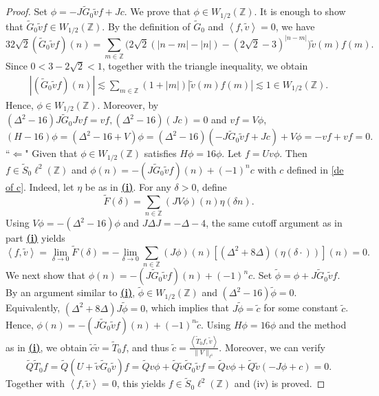 \documentclass[reqno, 11pt]{amsart}
\newcommand\Z{\mathbb{Z}}
\numberwithin{equation}{section}
\begin{document}
\begin{proof}
Set $\phi=-J\widetilde{G}_0\tilde{v}f+Jc.$ We prove that $\phi\in W_{1/2}(\Z)$. It is enough to show that $\widetilde{G}_0\tilde{v}f\in W_{1/2}(\Z)$. By the definition of $\widetilde{G}_0$ and $\left<f,\tilde{v}\right>=0$, we have
\begin{equation*}
32\sqrt2(\widetilde{G}_0\tilde{v}f)(n)
=\sum\limits_{m\in\Z}^{}\Big(2\sqrt2 (|n-m|-|n|)-\left(2\sqrt2-3\right)^{|n-m|}\Big)\tilde{v}(m)f(m).
\end{equation*}
Since $0<3-2\sqrt2<1$, together with the triangle inequality, we obtain
\begin{align*}
\left|(\widetilde{G}_0\tilde{v}f)(n)\right|\lesssim \sum\limits_{m\in\Z}(1+|m|)|\tilde{v}(m)f(m)|\lesssim1\in W_{1/2}(\Z).
\end{align*}
Hence, $\phi\in W_{1/2}(\Z)$. Moreover, by $(\Delta^2-16)J\widetilde{G}_0Jvf=vf,(\Delta^2-16)(Jc)=0$ and $vf=V\phi$,
$$(H-16)\phi=(\Delta^2-16+V)\phi=(\Delta^2-16)(-J\widetilde{G}_0\tilde{v}f+Jc)+V\phi=-vf+vf=0.$$
\vskip0.1cm
``$\bm{\Longleftarrow}$" Given that $\phi\in W_{1/2}(\Z)$ satisfies $H\phi=16\phi$. Let $f=Uv\phi$. Then $f\in \widetilde{S}_0\ell^2(\Z)$ and $\phi(n)=-(J\widetilde{G}_0\tilde{v}f)(n)+(-1)^nc$ with $c$ defined in \eqref{de of c}. Indeed, let $\eta$ be as in \textbf{\underline{(i)}}. For any $\delta>0$, define
$$\widetilde{F}(\delta)=\sum\limits_{n\in\Z}(JV\phi)(n)\eta(\delta n).$$
Using $V\phi=-(\Delta^2-16)\phi$ and $J\Delta J=-\Delta-4$, 
the same cutoff argument as in part \textbf{\underline{(i)}} yields
$$\left<f,\tilde{v}\right>=\lim\limits_{\delta\rightarrow0}\widetilde{F}(\delta)=-\lim\limits_{\delta\rightarrow0}\sum\limits_{n\in\Z} (J\phi)(n)[(\Delta^2+8\Delta)(\eta(\delta\cdot))](n)=0.$$
We next show that $\phi(n)=-(J\widetilde{G}_0\tilde{v}f)(n)+(-1)^nc$. Set $\tilde{\phi}=\phi+J\widetilde{G}_0\tilde{v}f$. By an argument similar to \textbf{\underline{(i)}}, $\tilde{\phi}\in W_{
1/2}(\Z)$ and $(\Delta^2-16)\tilde{\phi}=0$. Equivalently, $(\Delta^2+8\Delta)J\tilde{\phi}=0$, which implies that $J\tilde{\phi}=\tilde{c}$ for some constant $\tilde{c}$. Hence, $\phi(n)=-(J\widetilde G_0\tilde vf)(n)+(-1)^n\widetilde c.$ Using $H\phi=16\phi$ and the method as in {\bf{\underline{(i)}}}, we obtain $\tilde{c}\tilde{v}=\widetilde{T}_0f$, and thus $\tilde{c}=\frac{\left<\widetilde{T}_0f,\tilde{v}\right>}{\|V\|_{\ell^1}}$. Moreover, we can verify $$\widetilde{Q}\widetilde{T}_{0}f=\widetilde{Q}(U+\tilde{v}\widetilde{G}_{0}\tilde{v})f=\widetilde{Q}v\phi+\widetilde{Q}\tilde{v}\widetilde{G}_0\tilde{v}f=\widetilde{Q}v\phi+\widetilde{Q}\tilde{v}(-J\phi+c)=0.$$
Together with $\left<f,\tilde{v}\right>=0$, this yields $f\in \widetilde{S}_0\ell^2(\Z)$ and (iv) is proved. 

\end{proof}
\end{document}
